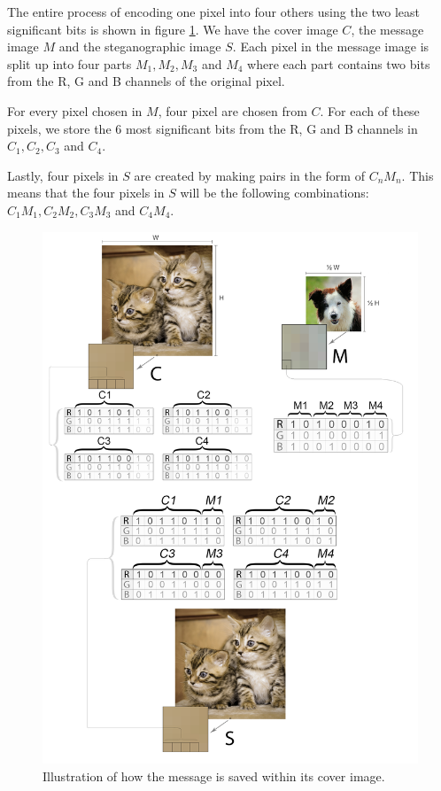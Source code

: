 The entire process of encoding one pixel into four others using the two least significant bits is shown in figure \ref{fig:hundigrafik}. We have the cover image $C$, the message image $M$ and the steganographic image $S$. Each pixel in the message image is split up into four parts $M_1, M_2, M_3$ and $M_4$ where each part contains two bits from the R, G and B channels of the original pixel.

For every pixel chosen in $M$, four pixel are chosen from $C$. For each of these pixels, we store the 6 most significant bits from the R, G and B channels in $C_1, C_2, C_3$ and $C_4$.

Lastly, four pixels in $S$ are created by making pairs in the form of $C_nM_n$. This means that the four pixels in $S$ will be the following combinations: $C_1M_1,C_2M_2,C_3M_3$ and $C_4M_4$.

\begin{figure}
	\centering
	\includegraphics[width=1\textwidth]{figures/hundikatgrafik.png}
	\caption{Illustration of how the message is saved within its cover image.}
	\label{fig:hundigrafik}
\end{figure}



